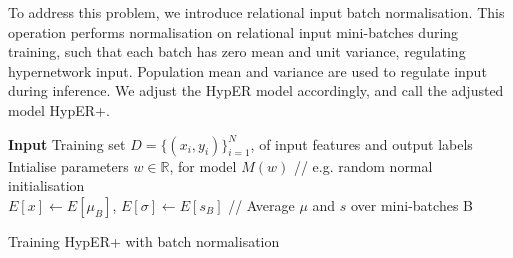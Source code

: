 \noindent To address this problem, we introduce relational input batch normalisation. This operation performs normalisation on relational input mini-batches during training, such that each batch has zero mean and unit variance, regulating hypernetwork input. Population mean and variance are used to regulate input during inference. We adjust the HypER model accordingly, and call the adjusted model HypER+. \par

\bigskip

\begin{algorithm}[H]
	\SetAlgoLined
	\textbf{Input} 
	Training set \begin{math} D = \{(x_i, y_i)\}_{i=1}^N \end{math}, of input features and output labels\;
	Intialise parameters $w \in \mathbb{R}$, for model \begin{math} M(w) \end{math} // e.g. random normal initialisation \\
	\begin{math} E[x] \gets E[\mu_B]  \end{math}, \begin{math} E[\sigma] \gets E[s_B]  \end{math} // Average $ \mu $ and $ s $ over mini-batches B 
	\caption{Training HypER+ with batch normalisation}
\end{algorithm} \bigbreak
 
